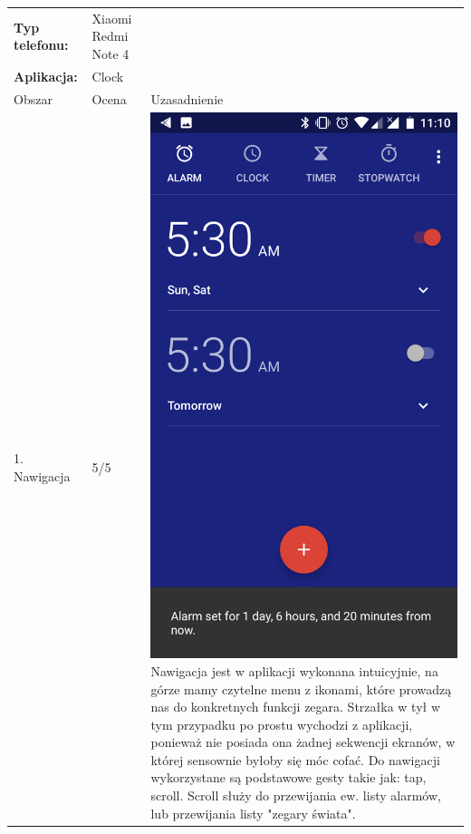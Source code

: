 \documentclass[12pt]{article}
\begin{document}
    \begin{longtable}{|p{}|p{}|p{}|}
        \cline{1-2}
        \textbf{Typ telefonu:} & Xiaomi Redmi Note 4\\
        \cline{1-2}
        \textbf{Aplikacja:} & Clock\\
        \hline
        Obszar & Ocena & Uzasadnienie\\
        \hline
        1. Nawigacja & 5/5 & \includegraphics[scale=0.1]{alarmset.png} Nawigacja jest w aplikacji wykonana intuicyjnie, na górze mamy czytelne menu z ikonami, które prowadzą nas do konkretnych funkcji zegara. Strzałka w tył w tym przypadku po prostu wychodzi z aplikacji, ponieważ nie posiada ona żadnej sekwencji ekranów, w której sensownie byłoby się móc cofać. Do nawigacji wykorzystane są podstawowe gesty takie jak: tap, scroll. Scroll służy do przewijania ew. listy alarmów, lub przewijania listy "zegary świata".\\

\end{longtable}
\end{document}
